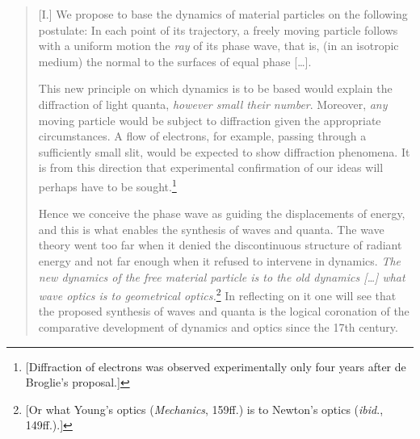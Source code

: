 \begin{quotation}
{[}I.{]} We propose to base the dynamics of material particles on the
following postulate: In each point of its trajectory, a freely moving
particle follows with a uniform motion the \emph{ray} of its phase wave,
that is, (in an isotropic medium) the normal to the surfaces of equal
phase [\ldots].

This new principle on which dynamics is to be based would explain the
diffraction of light quanta, \emph{however small their number}.
Moreover, \emph{any} moving particle would be subject to diffraction
given the appropriate circumstances. A flow of electrons, for example,
passing through a sufficiently small slit, would be expected to show
diffraction phenomena. It is from this direction that experimental
confirmation of our ideas will perhaps have to be sought.\footnote{{[}Diffraction
  of electrons was observed experimentally only four years after de
  Broglie's proposal.{]}}

Hence we conceive the phase wave as guiding the displacements of energy,
and this is what enables the synthesis of waves and quanta. The wave
theory went too far when it denied the discontinuous structure of
radiant energy and not far enough when it refused to intervene in
dynamics. \emph{The new dynamics of the free material particle is to
the old dynamics [\ldots] what wave optics is to geometrical
optics.}\footnote{{[}Or what Young's optics (\emph{Mechanics}, 159ff.)
  is to Newton's optics (\emph{ibid}., 149ff.).{]}} In reflecting on it
one will see that the proposed synthesis of waves and quanta is the
logical coronation of the comparative development of dynamics and optics
since the 17th century.


\end{quotation}
